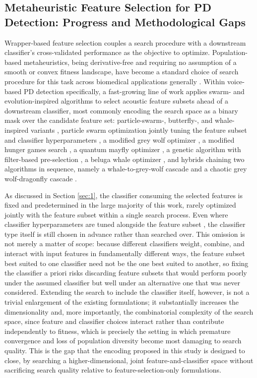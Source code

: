 \subsection{Metaheuristic Feature Selection for PD Detection: Progress and Methodological Gaps} \label{sec:2.3}
Wrapper-based feature selection couples a search procedure with a downstream classifier's cross-validated performance as the objective to optimize. Population-based metaheuristics, being derivative-free and requiring no assumption of a smooth or convex fitness landscape, have become a standard choice of search procedure for this task across biomedical applications generally \cite{BarreraGarcia:2023}. Within voice-based PD detection specifically, a fast-growing line of work applies swarm- and evolution-inspired algorithms to select acoustic feature subsets ahead of a downstream classifier, most commonly encoding the search space as a binary mask over the candidate feature set: particle-swarm-, butterfly-, and whale-inspired variants \cite{Hashemi:2026}, particle swarm optimization jointly tuning the feature subset and classifier hyperparameters \cite{Eliwa:2025}, a modified grey wolf optimizer \cite{Santhosh:2025}, a modified hunger games search \cite{Hashim:2023}, a quantum mayfly optimizer \cite{Mansour:2024}, a genetic algorithm with filter-based pre-selection \cite{Ali:2023}, a beluga whale optimizer \cite{Ganesan:2025}, and hybrids chaining two algorithms in sequence, namely a whale-to-grey-wolf cascade \cite{AlNajjar:2024} and a chaotic grey wolf-dragonfly cascade \cite{Appati:2026}.

As discussed in Section \ref{sec:1}, the classifier consuming the selected features is fixed and predetermined in the large majority of this work, rarely optimized jointly with the feature subset within a single search process. Even where classifier hyperparameters are tuned alongside the feature subset \cite{Eliwa:2025}, the classifier type itself is still chosen in advance rather than searched over. This omission is not merely a matter of scope: because different classifiers weight, combine, and interact with input features in fundamentally different ways, the feature subset best suited to one classifier need not be the one best suited to another, so fixing the classifier a priori risks discarding feature subsets that would perform poorly under the assumed classifier but well under an alternative one that was never considered. Extending the search to include the classifier itself, however, is not a trivial enlargement of the existing formulations; it substantially increases the dimensionality and, more importantly, the combinatorial complexity of the search space, since feature and classifier choices interact rather than contribute independently to fitness, which is precisely the setting in which premature convergence and loss of population diversity become most damaging to search quality. This is the gap that the encoding proposed in this study is designed to close, by searching a higher-dimensional, joint feature-and-classifier space without sacrificing search quality relative to feature-selection-only formulations.
